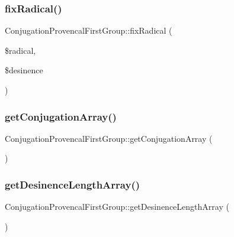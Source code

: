 \subsubsection{\texorpdfstring{fix\+Radical()}{fixRadical()}}
{\footnotesize\ttfamily Conjugation\+Provencal\+First\+Group\+::fix\+Radical (\begin{DoxyParamCaption}\item[{}]{\$radical,  }\item[{}]{\$desinence }\end{DoxyParamCaption})\hspace{0.3cm}{\ttfamily [protected]}}

\hypertarget{class_conjugation_provencal_first_group_a65f47dc174389bc9b680cef0a3e622a2}{}\label{class_conjugation_provencal_first_group_a65f47dc174389bc9b680cef0a3e622a2} 
\subsubsection{\texorpdfstring{get\+Conjugation\+Array()}{getConjugationArray()}}
{\footnotesize\ttfamily Conjugation\+Provencal\+First\+Group\+::get\+Conjugation\+Array (\begin{DoxyParamCaption}{ }\end{DoxyParamCaption})\hspace{0.3cm}{\ttfamily [protected]}}

\hypertarget{class_conjugation_provencal_first_group_a26ccc767ad4308637e382b4dd653f43a}{}\label{class_conjugation_provencal_first_group_a26ccc767ad4308637e382b4dd653f43a} 
\subsubsection{\texorpdfstring{get\+Desinence\+Length\+Array()}{getDesinenceLengthArray()}}
{\footnotesize\ttfamily Conjugation\+Provencal\+First\+Group\+::get\+Desinence\+Length\+Array (\begin{DoxyParamCaption}{ }\end{DoxyParamCaption})\hspace{0.3cm}{\ttfamily [protected]}}

